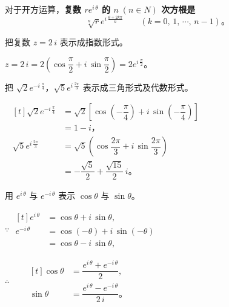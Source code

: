 对于开方运算，\textbf{复数 $r e^{i\,\theta}$ 的 $n \; (n \in N)$ 次方根是}
$$ \sqrt[n]{r} e^{i\,\frac{\theta + 2k\pi}{n}} \qquad (k = 0,\, 1,\, \cdots,\, n-1) \text{。} $$



\liti 把复数 $z = 2\,i$ 表示成指数形式。

\jie $z = 2\,i = 2 \left( \cos\dfrac{\pi}{2} + i\,\sin\dfrac{\pi}{2} \right) = 2 e^{i\,\frac{\pi}{2}}$。



\liti 把 $\sqrt{2} e^{-i\,\frac{\pi}{4}}$，$\sqrt{5} e^{i\,\frac{2\pi}{3}}$
表示成三角形式及代数形式。

\jie \, $\begin{aligned}[t]
    \sqrt{2} e^{-i\,\frac{\pi}{4}} &= \sqrt{2} \left[ \cos\left( -\dfrac{\pi}{4} \right) + i\,\sin\left( -\dfrac{\pi}{4} \right) \right] \\
        &= 1 - i \text{，} \\
    \sqrt{5} e^{i\,\frac{2\pi}{3}} &= \sqrt{5} \left( \cos\dfrac{2\pi}{3} + i\,\sin\dfrac{2\pi}{3} \right) \\
        &= -\dfrac{\sqrt{5}}{2} + \dfrac{\sqrt{15}}{2}\,i \text{。}
\end{aligned}$


\liti 用 $e^{i\,\theta}$ 与 $e^{-i\,\theta}$ 表示 $\cos\theta$ 与 $\sin\theta$。

\jie $\because$ \quad $\begin{aligned}[t]
    e^{i\,\theta} &= \cos\theta + i\,\sin\theta, \\
    e^{-i\,\theta} &= \cos(-\theta) + i\,\sin(-\theta) \\
        &= \cos\theta - i\,\sin\theta ,
\end{aligned}$

$\therefore \qquad \begin{aligned}[t]
    \cos\theta &= \dfrac{e^{i\,\theta} + e^{-i\,\theta}}{2} , \\
    \sin\theta &= \dfrac{e^{i\,\theta} - e^{-i\,\theta}}{2\,i} \text{。}
\end{aligned}$




